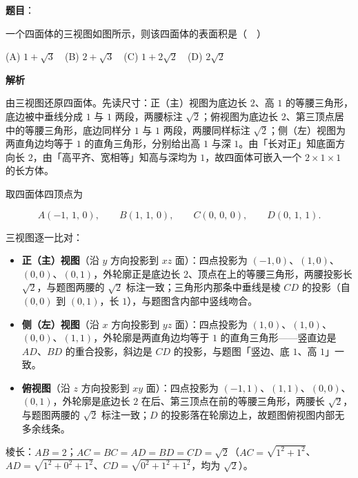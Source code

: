 \begin{answer}

\textbf{题目}：

一个四面体的三视图如图所示，则该四面体的表面积是（　）
\nopagebreak[4]
\begin{center}\end{center}
\nopagebreak[4]
(A) \(1+\sqrt{3}\)　(B) \(2+\sqrt{3}\)　(C) \(1+2\sqrt{2}\)　(D) \(2\sqrt{2}\)

\textbf{解析}

由三视图还原四面体。先读尺寸：正（主）视图为底边长 \(2\)、高 \(1\) 的等腰三角形，底边被中垂线分成 \(1\) 与 \(1\) 两段，两腰标注 \(\sqrt{2}\)；俯视图为底边长 \(2\)、第三顶点居中的等腰三角形，底边同样分 \(1\) 与 \(1\) 两段，两腰同样标注 \(\sqrt{2}\)；侧（左）视图为两直角边均等于 \(1\) 的直角三角形，分别给出高 \(1\) 与深 \(1\)。由「长对正」知底面方向长 \(2\)，由「高平齐、宽相等」知高与深均为 \(1\)，故四面体可嵌入一个 \(2\times 1\times 1\) 的长方体。

取四面体四顶点为

\nopagebreak[4]
\[
A(-1,\,1,\,0),\qquad B(1,\,1,\,0),\qquad C(0,\,0,\,0),\qquad D(0,\,1,\,1).
\]

三视图逐一比对：

\begin{itemize}
\item \textbf{正（主）视图}（沿 \(y\) 方向投影到 \(xz\) 面）：四点投影为 \((-1,0)\)、\((1,0)\)、\((0,0)\)、\((0,1)\)，外轮廓正是底边长 \(2\)、顶点在上的等腰三角形，两腰投影长 \(\sqrt{2}\)，与题图两腰的 \(\sqrt{2}\) 标注一致；三角形内那条中垂线是棱 \(CD\) 的投影（自 \((0,0)\) 到 \((0,1)\)，长 \(1\)），与题图含内部中竖线吻合。
\item \textbf{侧（左）视图}（沿 \(x\) 方向投影到 \(yz\) 面）：四点投影为 \((1,0)\)、\((1,0)\)、\((0,0)\)、\((1,1)\)，外轮廓是两直角边均等于 \(1\) 的直角三角形——竖直边是 \(AD\)、\(BD\) 的重合投影，斜边是 \(CD\) 的投影，与题图「竖边、底 \(1\)、高 \(1\)」一致。
\item \textbf{俯视图}（沿 \(z\) 方向投影到 \(xy\) 面）：四点投影为 \((-1,1)\)、\((1,1)\)、\((0,0)\)、\((0,1)\)，外轮廓是底边长 \(2\) 在后、第三顶点在前的等腰三角形，两腰长 \(\sqrt{2}\)，与题图两腰的 \(\sqrt{2}\) 标注一致；\(D\) 的投影落在轮廓边上，故题图俯视图内部无多余线条。
\end{itemize}

棱长：\(AB=2\)；\(AC=BC=AD=BD=CD=\sqrt{2}\)（\(AC=\sqrt{1^{2}+1^{2}}\)、\(AD=\sqrt{1^{2}+0^{2}+1^{2}}\)、\(CD=\sqrt{0^{2}+1^{2}+1^{2}}\)，均为 \(\sqrt{2}\)）。


\end{answer}
